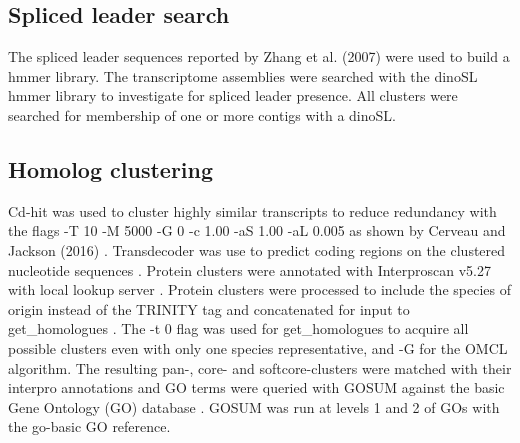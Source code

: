 \documentclass[12pt]{article}
\begin{document}
\subsection*{Spliced leader search}
The spliced leader sequences reported by Zhang et al. (2007) were used to build a hmmer library. 
The transcriptome assemblies were searched with the dinoSL hmmer library to investigate for spliced leader presence. 
All clusters were searched for membership of one or more contigs with a dinoSL.

\subsection*{Homolog clustering}
Cd-hit was used to cluster highly similar transcripts to reduce redundancy with the flags -T 10 -M 5000 -G 0 -c 1.00 -aS 1.00 -aL 0.005 as shown by Cerveau and Jackson (2016) \cite{cerveau2016combining,fu2012cd}. 
Transdecoder was use to predict coding regions on the clustered nucleotide sequences \cite{haas2016transdecoder}.
Protein clusters were annotated with Interproscan v5.27 with local lookup server \cite{quevillon2005interproscan}.
Protein clusters were processed to include the species of origin instead of the TRINITY tag and concatenated for input to get\_homologues \cite{vinuesa2015robust}. 
The -t 0 flag was used for get\_homologues to acquire all possible clusters even with only one species representative, and -G for the OMCL algorithm. 
The resulting pan-, core- and softcore-clusters were matched with their interpro annotations and GO terms were queried with GOSUM against the basic Gene Ontology (GO) database \cite{timgosum,ashburner2000gene,gene2016expansion}. 
GOSUM was run at levels 1 and 2 of GOs with the go-basic GO reference. 
\end{document}

